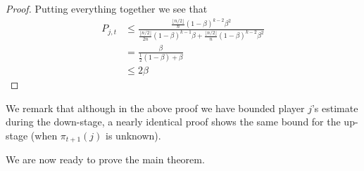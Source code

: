 \documentclass[12pt]{article}
\theoremstyle{definition}
\newcommand{\Pjt}{P_{j,t}}
\begin{document}
\begin{proof}
Putting everything together we see that 
{\belowdisplayskip=-14pt
\begin{align*}
\Pjt &\le \frac{\frac{\lfloor n/2\rfloor}{n} (1-\beta)^{k-2}\beta^2}
{\frac{\lfloor n/2\rfloor}{2n} (1-\beta)^{k-1}\beta
+ \frac{\lfloor n/2\rfloor}{n} (1-\beta)^{k-2}\beta^2}\\
&= \frac{\beta}{\frac12(1-\beta) +\beta}\\
&\le 2\beta   
\end{align*} \qedhere}
\end{proof}

We remark that although in the above proof we have bounded player $j$'s
estimate during the down-stage,  a nearly identical proof shows the same bound for the 
up-stage (when $\pi_{t+1}(j)$ is unknown).

We are now ready to prove the main theorem. 
\end{document}
